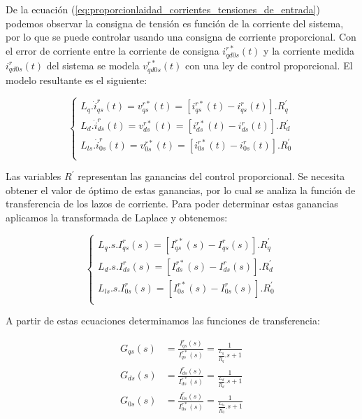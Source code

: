 \documentclass{article}
\begin{document}
De la ecuación (\ref{eq:proporcionlaidad_corrientes_tensiones_de_entrada}) podemos observar 
la consigna de tensión es función de la corriente del sistema, por lo que se puede controlar usando 
una consigna de corriente proporcional. Con el error de corriente entre la corriente de consigna 
$i_{qd0s}^{r*}(t)$ y la corriente medida $i_{qd0s}^{r}(t)$ del sistema se modela $v_{qd0s}^{r*}(t)$ 
con una ley de control proporcional. El modelo resultante es el siguiente:

\begin{equation}
    \begin{cases}
        L_q. \dot{i}_{qs}^r(t) = v^{r*}_{qs}(t) = [i_{qs}^{r*}(t) - i_{qs}^r(t)].R_q^\prime \\
        L_d. \dot{i}_{ds}^r(t) = v^{r*}_{ds}(t) = [i_{ds}^{r*}(t) - i_{ds}^r(t)].R_d^\prime \\
        L_{ls}. \dot{i}_{0s}^r(t) = v^{r*}_{0s}(t) = [i_{0s}^{r*}(t) - i_{0s}^r(t)].R_{0}^\prime \\
    \end{cases}
\end{equation}

Las variables $R^\prime$ representan las ganancias del control proporcional. Se necesita obtener 
el valor de óptimo de estas ganancias, por lo cual se analiza la función de transferencia de los lazos de corriente.
Para poder determinar estas ganancias aplicamos la transformada de Laplace y obtenemos:

\begin{equation}
    \begin{cases}
        L_q. s.I_{qs}^r(s) = [I_{qs}^{r*}(s) - I_{qs}^r(s)].R_q^\prime \\
        L_d. s.I_{ds}^r(s) = [I_{ds}^{r*}(s) - I_{ds}^r(s)].R_d^\prime \\
        L_{ls}. s.I_{0s}^r(s) = [I_{0s}^{r*}(s) - I_{0s}^r(s)].R_{0}^\prime \\
    \end{cases}
\end{equation}

A partir de estas ecuaciones determinamos las funciones de transferencia:

\begin{align*}
    G_{qs}(s) &= \frac{I_{qs}^r(s)}{I_{qs}^{r*}(s)} = \frac{1}{\frac{L_q}{R_q^\prime}.s + 1}  \\
    G_{ds}(s) &= \frac{I_{ds}^r(s)}{I_{ds}^{r*}(s)} = \frac{1}{\frac{L_d}{R_d^\prime}.s + 1}  \\
    G_{0s}(s) &= \frac{I_{0s}^r(s)}{I_{0s}^{r*}(s)} = \frac{1}{\frac{L_{ls}}{R_{0}^\prime}.s + 1}
\end{align*}
\end{document}

